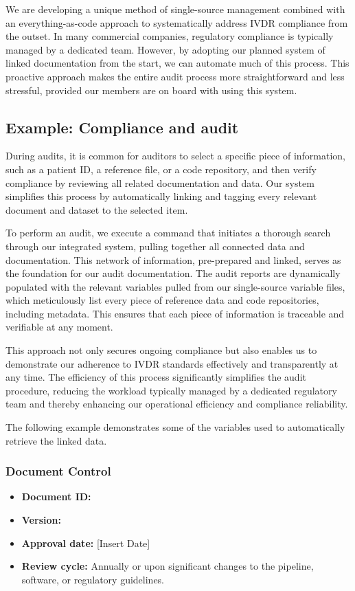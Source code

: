 We are developing a unique method of single-source management combined with an everything-as-code approach to systematically address IVDR compliance from the outset. In many commercial companies, regulatory compliance is typically managed by a dedicated team. However, by adopting our planned system of linked documentation from the start, we can automate much of this process. 
This proactive approach makes the entire audit process more straightforward and less stressful, provided our members are on board with using this system.

\subsection{Example: Compliance and audit}

During audits, it is common for auditors to select a specific piece of information, such as a patient ID, a reference file, or a code repository, and then verify compliance by reviewing all related documentation and data. Our system simplifies this process by automatically linking and tagging every relevant document and dataset to the selected item.

To perform an audit, we execute a command that initiates a thorough search through our integrated system, pulling together all connected data and documentation. This network of information, pre-prepared and linked, serves as the foundation for our audit documentation. The audit reports are dynamically populated with the relevant variables pulled from our single-source variable files, which meticulously list every piece of reference data and code repositories, including metadata. This ensures that each piece of information is traceable and verifiable at any moment.

This approach not only secures ongoing compliance but also enables us to demonstrate our adherence to IVDR standards effectively and transparently at any time. The efficiency of this process significantly simplifies the audit procedure, reducing the workload typically managed by a dedicated regulatory team and thereby enhancing our operational efficiency and compliance reliability.

The following example demonstrates some of the variables used to automatically retrieve the linked data.

\subsubsection{Document Control}
\begin{itemize}
    \item \textbf{Document ID:} \documentID
    \item \textbf{Version:} \documentVersion
    \item \textbf{Approval date:} [Insert Date]
    \item \textbf{Review cycle:} Annually or upon significant changes to the pipeline, software, or regulatory guidelines.
\end{itemize}

